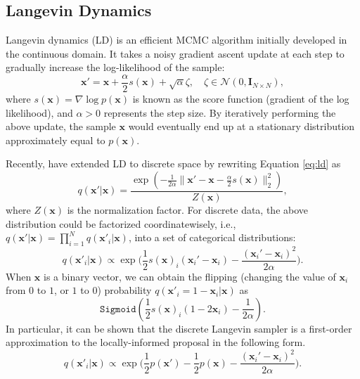 \subsection{Langevin Dynamics}
Langevin dynamics (LD) \citep{Welling2011LD} is an efficient MCMC algorithm initially developed in the continuous domain. It takes a noisy gradient ascent update at each step to gradually increase the log-likelihood of the sample:
\begin{equation}
\label{eq:ld}
    \mathbf{x}' = \mathbf{x} + \frac{\alpha}{2}  s(\mathbf{x}) + \sqrt{\alpha} \zeta, \quad \zeta\in\mathcal{N}(0, \mathbf{I}_{N\times N}),
\end{equation}
where $s(\mathbf{x})=\nabla \log p(\mathbf{x})$ is known as the score function (gradient of the log likelihood), and $\alpha>0$ represents the step size. By iteratively performing the above update, the sample $\mathbf{x}$ would eventually end up at a stationary distribution approximately equal to $p(\mathbf{x})$.

 Recently, \citet{zhang2022langevinlike} have extended LD  to discrete space  by rewriting Equation \ref{eq:ld} as
 \begin{equation}
    \label{eq:ld_exp}
    q(\mathbf{x}'|\mathbf{x})=\frac{\exp(-{\frac{1}{2\alpha}\|\mathbf{x}'-\mathbf{x}-\frac{\alpha}{2}s(\mathbf{x})}\|_2^2)}{Z(\mathbf{x})},
 \end{equation}
 where $Z(\mathbf{x})$ is the normalization factor. For discrete data, the above distribution could be factorized coordinatewisely, i.e., $q(\mathbf{x}'|\mathbf{x}) = \prod_{i=1}^Nq(\mathbf{x}'_i|\mathbf{x})$, into a set of categorical distributions:
\begin{equation}
    q(\mathbf{x}'_i|\mathbf{x})\propto \exp({\frac{1}{2}s(\mathbf{x})_i(\mathbf{x}_i'-\mathbf{x}_i)-\frac{(\mathbf{x}_i'-\mathbf{x}_i)^2}{2\alpha})}.
\end{equation}
When $\mathbf{x}$ is a binary vector, we can obtain the flipping (changing the value of $\mathbf{x}_i$ from $0$ to $1$, or $1$ to $0$)  probability $q(\mathbf{x}'_i=1-\mathbf{x}_i|\mathbf{x})$ as 
\begin{equation}
\label{eq:flip}
\texttt{Sigmoid}(\frac{1}{2}s(\mathbf{x})_i(1-2\mathbf{x}_i)-\frac{1}{2\alpha}).
\end{equation}
In particular, it can be shown that the discrete Langevin sampler is a first-order approximation to the locally-informed proposal \citep{zanella2017informed} in the following form.
\begin{equation}
\label{eq:local}
q(\mathbf{x}'_i|\mathbf{x})\propto \exp({\frac{1}{2}p(\mathbf{x}')-\frac{1}{2}p(\mathbf{x})-\frac{(\mathbf{x}_i'-\mathbf{x}_i)^2}{2\alpha})}.
\end{equation}
